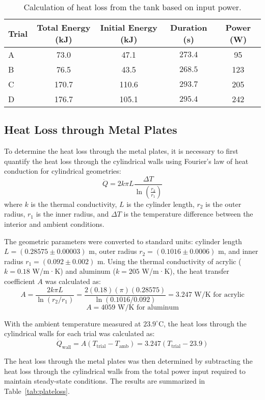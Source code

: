 \documentclass[12pt]{article}
\begin{document}
\begin{table}[h!]
\centering
\caption{Calculation of heat loss from the tank based on input power.}
\label{tab:heatloss}
\begin{tabular}{@{}lcccc@{}}
\toprule
\textbf{Trial} & \textbf{Total Energy (kJ)} & \textbf{Initial Energy (kJ)} & \textbf{Duration (s)} & \textbf{Power (W)} \\ \midrule
A & 73.0 & 47.1 & $273.4$ & 95 \\
B & 76.5 & 43.5 & $268.5$ & 123 \\
C & 170.7 & 110.6 & $293.7$ & 205 \\
D & 176.7 & 105.1 & $295.4$ & 242 \\ \bottomrule
\end{tabular}
\end{table}

\subsection{Heat Loss through Metal Plates}

To determine the heat loss through the metal plates, it is necessary to first quantify the heat loss through the cylindrical walls using Fourier's law of heat conduction for cylindrical geometries:
\[
\dot{Q} = 2k\pi L \frac{\Delta T}{\ln\left(\frac{r_2}{r_1}\right)}
\]
where \(k\) is the thermal conductivity, \(L\) is the cylinder length, \(r_2\) is the outer radius, \(r_1\) is the inner radius, and \(\Delta T\) is the temperature difference between the interior and ambient conditions.

The geometric parameters were converted to standard units: cylinder length \(L = (0.28575 \pm 0.00003)\) m, outer radius \(r_2 = (0.1016 \pm 0.0006)\) m, and inner radius \(r_1 = (0.092 \pm 0.002)\) m. Using the thermal conductivity of acrylic (\(k = 0.18\) W/m·K) and aluminum (\(k = 205\) W/m·K), the heat transfer coefficient \(A\) was calculated as:
\[
A = \frac{2k\pi L}{\ln(r_2/r_1)} = \frac{2(0.18)(\pi)(0.28575)}{\ln(0.1016/0.092)} = 3.247 \text{ W/K for acrylic}
\]
\[
A = 4059 \text{ W/K for aluminum}
\]

With the ambient temperature measured at \(23.9^{\circ}\)C, the heat loss through the cylindrical walls for each trial was calculated as:
\[
\dot{Q}_{\text{wall}} = A(T_{\text{trial}} - T_{\text{amb}}) = 3.247(T_{\text{trial}} - 23.9)
\]

The heat loss through the metal plates was then determined by subtracting the heat loss through the cylindrical walls from the total power input required to maintain steady-state conditions. The results are summarized in Table~\ref{tab:plateloss}.
\end{document}
